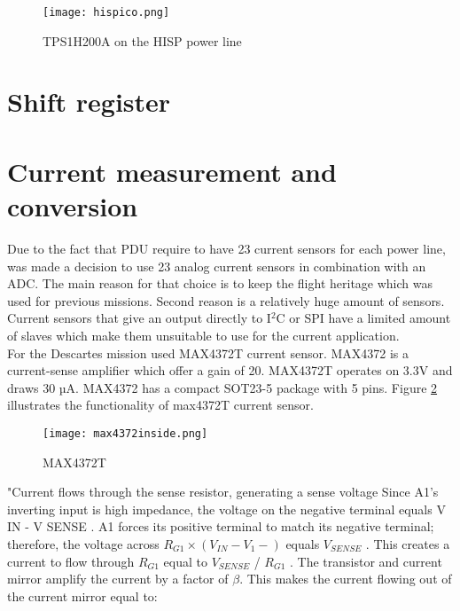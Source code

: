  

\begin{figure}[h]
	\centering
	\texttt{[image: hispico.png]}
	\caption{TPS1H200A on the HISP power line}
	\label{fig: hispico}
\end{figure}



 
\section{Shift register}


\section{Current measurement and conversion}

Due to the fact that PDU require to have 23 current sensors for each power line, was made a decision to use 23 analog current sensors in combination with an ADC. The main reason for that choice is to keep the flight heritage which was used for previous missions. Second reason is a relatively huge amount of sensors. Current sensors that give an output directly to I$^2$C or SPI have a limited amount of slaves which make them unsuitable to use for the current application.\\

For the Descartes mission used MAX4372T current sensor. MAX4372 is a current-sense amplifier which offer a gain of 20. MAX4372T operates on 3.3V and draws 30 µA. MAX4372 has a compact SOT23-5 package with 5 pins. Figure \ref{fig: max4372t_inside} illustrates the functionality of max4372T current sensor.

 \begin{figure}[h]
 	\centering
 	\texttt{[image: max4372inside.png]}
 	\caption{MAX4372T \cite{24}}
 	\label{fig: max4372t_inside}
 \end{figure} 

\cite{23}"Current flows through the sense resistor, generating a
sense voltage  Since
A1’s inverting input is high impedance, the voltage on
the negative terminal equals V IN - V SENSE . A1 forces its
positive terminal to match its negative terminal; therefore,
the voltage across $R_{G1}\times (V_{IN} - V_{1}-)$ equals $V_{SENSE}$ . This
creates a current to flow through $R_{G1}$ equal to $V_{SENSE}$ /
$R_{G1}$ . The transistor and current mirror amplify the current
by a factor of $\beta$. This makes the current flowing out of the
current mirror equal to: 


